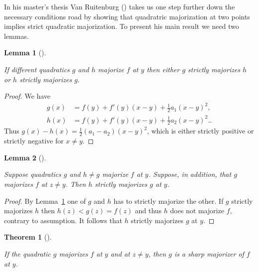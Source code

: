 \documentclass[
  12pt,
  letterpaper,
  DIV=11,
  numbers=noendperiod]{scrartcl}
\theoremstyle{definition}
\theoremstyle{definition}
\theoremstyle{plain}
\theoremstyle{plain}
\newtheorem{theorem}{Theorem}[section]
\theoremstyle{plain}
\newtheorem{lemma}{Lemma}[section]
\theoremstyle{remark}
\begin{document}
In his master's thesis Van Ruitenburg
() takes us one step further down
the necessary conditions road by showing that quadratric majorization at
two points implies strict quadratic majorization. To present his main
result we need two lemmas.

\begin{lemma}[]\protect\hypertarget{lem-fan}{}\label{lem-fan}

If different quadratics \(g\) and \(h\) majorize \(f\) at \(y\) then
either \(g\) strictly majorizes \(h\) or \(h\) strictly majorizes \(g\).

\end{lemma}

\begin{proof}
We have \begin{subequations}
\begin{align}
g(x)&=f(y)+f'(y)(x-y)+\frac12a_1(x-y)^2,\label{eq-gfunc}\\
h(x)&=f(y)+f'(y)(x-y)+\frac12a_2(x-y)^2.\label{eq-hfunc}.
\end{align}
\end{subequations} Thus \(g(x)-h(x)=\frac12(a_1-a_2)(x-y)^2\), which is
either strictly positive or strictly negative for \(x\not= y\).
\end{proof}

\begin{lemma}[]\protect\hypertarget{lem-ruit}{}\label{lem-ruit}

Suppose quadratics \(g\) and \(h\not= g\) majorize \(f\) at \(y\).
Suppose, in addition, that \(g\) majorizes \(f\) at \(z\not=y\). Then
\(h\) strictly majorizes \(g\) at \(y\).

\end{lemma}

\begin{proof}
By Lemma~\ref{lem-fan} one of \(g\) and \(h\) has to strictly majorize
the other. If \(g\) strictly majorizes \(h\) then \(h(z)<g(z)=f(z)\) and
thus \(h\) does not majorize \(f\), contrary to assumption. It follows
that \(h\) strictly majorizes \(g\) at \(y\).
\end{proof}

\begin{theorem}[]\protect\hypertarget{thm-ruit}{}\label{thm-ruit}

If the quadratic \(g\) majorizes \(f\) at \(y\) and at \(z\not= y\),
then \(g\) is a sharp majorizer of \(f\) at \(y\).

\end{theorem}
\end{document}
